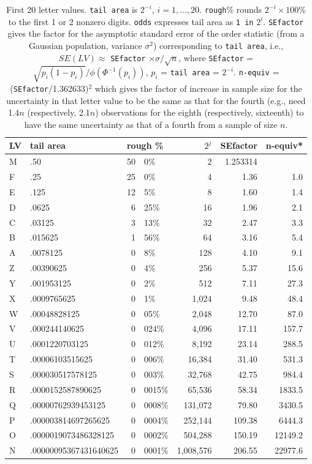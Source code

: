 \documentclass[oneside]{article}
\begin{document}
\begin{table}[htpb]
  \centering
  \begin{tabular}{llr@{.}lrrr}
  \toprule
   LV & tail area & \multicolumn{2}{l}{rough \%} & $2^j$ & SEfactor & n-equiv* & \\
  \midrule
   M & .50 & 50 & 0\% & 2 & 1.253314 & \\
   F & .25 & 25 & 0\% & 4 & 1.36 & 1.0\\
   E & .125 & 12 & 5\% & 8 & 1.60 & 1.4\\
   D & .0625 & 6 & 25\% & 16 & 1.96 & 2.1\\
   C & .03125 & 3 & 13\% & 32 & 2.47 & 3.3\\
   B & .015625 & 1 & 56\% & 64 & 3.16 & 5.4\\
   A & .0078125 & 0 & 8\% & 128 & 4.10 & 9.1\\
   Z & .00390625 & 0 & 4\% & 256 & 5.37 & 15.6\\
   Y & .001953125 & 0 & 2\% & 512 & 7.11 & 27.3\\
   X & .0009765625 & 0 & 1\% & 1,024 & 9.48 & 48.4\\
   W & .00048828125 & 0 & 05\% & 2,048 & 12.70 & 87.0\\
   V & .000244140625 & 0 & 024\% & 4,096 & 17.11 & 157.7\\
   U & .0001220703125 & 0 & 012\% & 8,192 & 23.14 & 288.5\\
   T & .00006103515625 & 0 & 006\% & 16,384 & 31.40 & 531.3\\
   S & .000030517578125 & 0 & 003\% & 32,768 & 42.75 & 984.4\\
   R & .0000152587890625 & 0 & 0015\% & 65,536 & 58.34 & 1833.5\\
   Q & .00000762939453125 & 0 & 0008\% & 131,072 & 79.80 & 3430.5\\
   P & .000003814697265625 & 0 & 0004\% & 252,144 & 109.38 & 6444.3\\
   O & .0000019073486328125 & 0 & 0002\% & 504,288 & 150.19 & 12149.2\\
   N & .00000095367431640625 & 0 & 0001\% & 1,008,576 & 206.55 & 22977.6\\
  \bottomrule
  \end{tabular}

  \caption{First 20 letter values. \texttt{tail area} is $2 ^{-i}$, $i =
  1, ..., 20$. \texttt{rough}\% rounds $2 ^{-i} \times 100$\% to the first 1
  or 2 nonzero digits. \texttt{odds} expresses tail area as \texttt{1 in}
  $2^i$. \texttt{SEfactor} gives the factor for the asymptotic standard
  error of the order statistic (from a Gaussian population, variance
  $\sigma^2$) corresponding to \texttt{tail area}, i.e., $SE(LV) \approx$
  \texttt{SEfactor} $\times \sigma / \sqrt{n}$, where \texttt{SEfactor} =
  $\sqrt{p_i (1-p_i)} / \phi(\Phi^{-1}(p_i))$, $p_i$ = \texttt{tail area} =
  $2^{-i}$. \texttt{n-equiv} = (\texttt{SEfactor}/1.362633)$^2$ which gives
  the factor of increase in sample size for the uncertainty in that letter
  value to be the same as that for the fourth (e.g., need 1.4$n$
  (respectively, 2.1$n$) observations for the eighth (respectively, sixteenth)
  to have the same uncertainty as that of a fourth from a sample of size $n$.}
  \label{tbl:letter-values}
\end{table}
\end{document}
